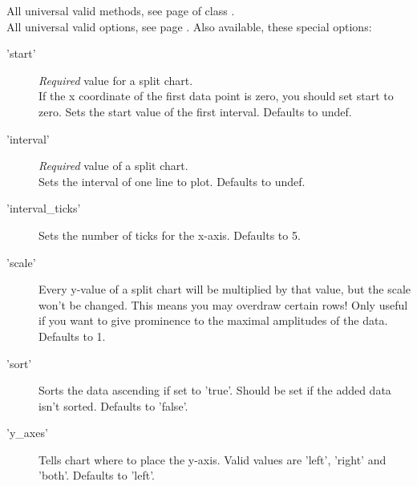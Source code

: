 \Methods
All universal valid methods, see page \pageref{methods} of class
.\\[\parabstand]
%
\Attributes
All universal valid options, see page \pageref{options}. 
Also available, these special options:
\begin{description}
\item['start'] \emph{Required} value for a split chart. \\
               If the x coordinate of the first data point is zero, 
               you should set start to zero. 
               Sets the start value of the first interval. Defaults to undef.
               
\item['interval'] \emph{Required} value of a split chart.\\
                Sets the interval of one line to plot. Defaults to undef.
                
\item['interval\_ticks'] Sets the number of ticks for the x-axis. Defaults to 5.

\item['scale'] Every y-value of a split chart will be multiplied by that value, 
               but the scale won't be changed. This means you may overdraw certain rows! 
               Only useful if you want to give prominence to the maximal amplitudes of the data.
               Defaults to 1.
               
\item['sort'] Sorts the data ascending if set to 'true'. 
              Should be set if the added data isn't sorted. Defaults to 'false'.  
              
\item['y\_axes'] Tells chart where to place the y-axis. 
                 Valid values are 'left', 'right' and 'both'. Defaults to 'left'.
\end{description}
